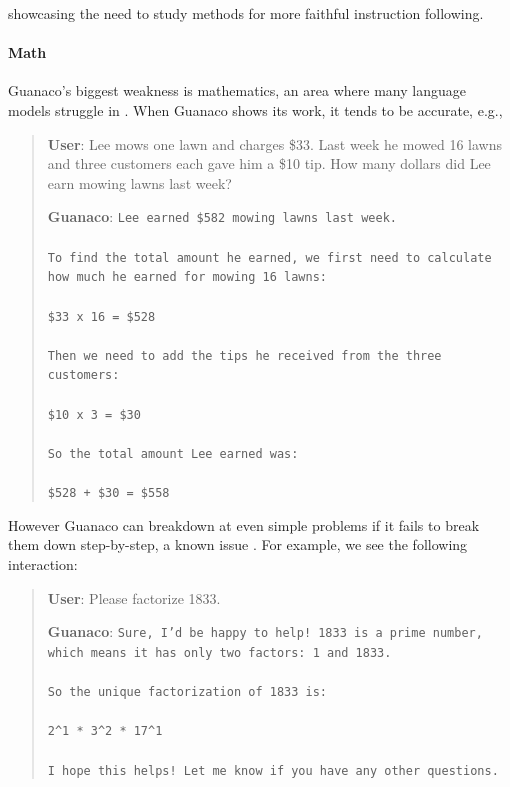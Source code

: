 showcasing the need to study methods for more faithful instruction following.

\paragraph{Math} {Guanaco}'s biggest weakness is mathematics, an area where many language models struggle in \citep{liang2022holistic}. When {Guanaco} shows its work, it tends to be accurate, e.g.,

\begin{quote}
    \textbf{User}: Lee mows one lawn and charges \$33. Last week he mowed 16 lawns and three customers each gave him a \$10 tip. How many dollars did Lee earn mowing lawns last week?

    \textbf{Guanaco}: \texttt{Lee earned \$582 mowing lawns last week. \\ \\ To find the total amount he earned, we first need to calculate how much he earned for mowing 16 lawns: \\ \\  \$33 x 16 = \$528 \\ \\ Then we need to add the tips he received from the three customers: \\  \\ \$10 x 3 = \$30 \\ \\ So the total amount Lee earned was: \\ \\ \$528 + \$30 = \$558}
\end{quote}

However {Guanaco} can breakdown at even simple problems if it fails to break them down step-by-step, a known issue \cite{weichain}. For example, we see the following interaction:

\begin{quote}
    \textbf{User}: Please factorize 1833.

    \textbf{Guanaco}: \texttt{Sure, I'd be happy to help! 1833 is a prime number, which means it has only two factors: 1 and 1833. \\ \\ So the unique factorization of 1833 is: \\ \\ 2\^{}1 * 3\^{}2 * 17\^{}1 \\ \\ I hope this helps! Let me know if you have any other questions.}
\end{quote}

